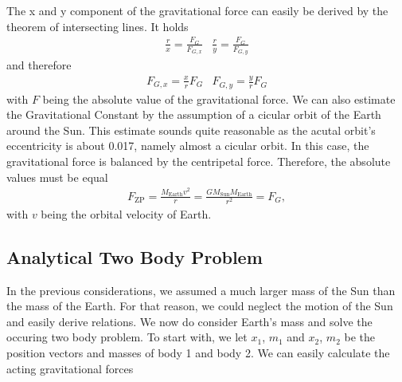 \documentclass[a4paper]{article}
\begin{document}
The x and y component of the gravitational force can easily be derived by the theorem of intersecting lines.
It holds
\begin{subequations}
\begin{align}
\frac{r}{x} = \frac{F_G}{F_{G,x}}
\end{align}
\begin{align}
\frac{r}{y} = \frac{F_G}{F_{G,y}}
\end{align}
\end{subequations}
and therefore
\begin{subequations}
\begin{align}
F_{G,x} = \frac{x}{r} F_G
\end{align}
\begin{align}
F_{G,y} = \frac{y}{r} F_G
\end{align}
\end{subequations}
with $F$ being the absolute value of the gravitational force.
\newline
We can also estimate the Gravitational Constant by the assumption of a cicular orbit of the Earth around the Sun. This estimate sounds quite reasonable as the acutal orbit's eccentricity is about 0.017, namely almost a cicular orbit.
In this case, the gravitational force is balanced by the centripetal force. Therefore, the absolute values must be equal
\begin{align}
F_{\mathrm{ZP}} = \frac{M_{\mathrm{Earth}}v^2}{r}=\frac{GM_{\mathrm{Sun}}M_{\mathrm{Earth}}}{r^2} = F_G,
\end{align}
with $v$ being the orbital velocity of Earth.

 
 
 
\subsection{Analytical Two Body Problem}
In the previous considerations, we assumed a much larger mass of the Sun than the mass of the Earth. For that reason, we could neglect the motion of the Sun and easily derive relations. We now do consider Earth's mass and solve the occuring two body problem.
\newline
To start with, we let $x_1$, $m_1$ and $x_2$, $m_2$ be the position vectors and masses of body 1 and body 2. We can easily calculate the acting gravitational forces 
\end{document}
